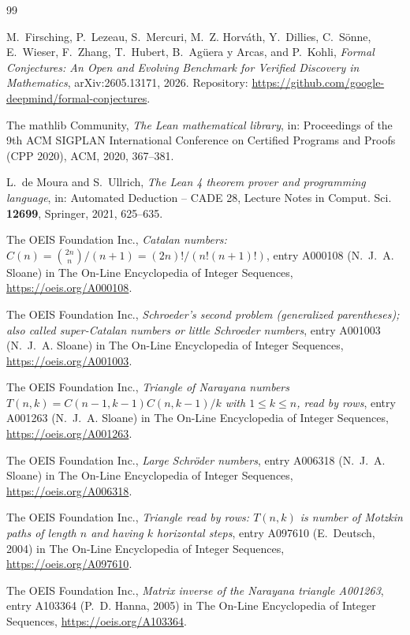 \documentclass[11pt]{amsart}
\theoremstyle{plain}
\theoremstyle{definition}
\begin{document}
{\footnotesize
\begin{thebibliography}{99}

M.~Firsching, P.~Lezeau, S.~Mercuri, M.~Z. Horv\'ath, Y.~Dillies, C.~S\"onne, E.~Wieser, F.~Zhang, T.~Hubert, B.~Ag\"uera y Arcas, and P.~Kohli, \emph{Formal Conjectures: An Open and Evolving Benchmark for Verified Discovery in Mathematics}, arXiv:2605.13171, 2026. Repository: \url{https://github.com/google-deepmind/formal-conjectures}.

The mathlib Community, \emph{The Lean mathematical library}, in: Proceedings of the 9th ACM SIGPLAN International Conference on Certified Programs and Proofs (CPP 2020), ACM, 2020, 367--381.

L.~de Moura and S.~Ullrich, \emph{The Lean 4 theorem prover and programming language}, in: Automated Deduction -- CADE 28, Lecture Notes in Comput. Sci. \textbf{12699}, Springer, 2021, 625--635.

The OEIS Foundation Inc., \emph{Catalan numbers: $C(n)=\binom{2n}{n}/(n+1)=(2n)!/(n!(n+1)!)$}, entry A000108 (N.~J.~A. Sloane) in The On-Line Encyclopedia of Integer Sequences, \url{https://oeis.org/A000108}.

The OEIS Foundation Inc., \emph{Schroeder's second problem (generalized parentheses); also called super-Catalan numbers or little Schroeder numbers}, entry A001003 (N.~J.~A. Sloane) in The On-Line Encyclopedia of Integer Sequences, \url{https://oeis.org/A001003}.

The OEIS Foundation Inc., \emph{Triangle of Narayana numbers $T(n,k)=C(n-1,k-1)C(n,k-1)/k$ with $1\le k\le n$, read by rows}, entry A001263 (N.~J.~A. Sloane) in The On-Line Encyclopedia of Integer Sequences, \url{https://oeis.org/A001263}.

The OEIS Foundation Inc., \emph{Large Schr\"oder numbers}, entry A006318 (N.~J.~A. Sloane) in The On-Line Encyclopedia of Integer Sequences, \url{https://oeis.org/A006318}.

The OEIS Foundation Inc., \emph{Triangle read by rows: $T(n,k)$ is number of Motzkin paths of length $n$ and having $k$ horizontal steps}, entry A097610 (E.~Deutsch, 2004) in The On-Line Encyclopedia of Integer Sequences, \url{https://oeis.org/A097610}.

The OEIS Foundation Inc., \emph{Matrix inverse of the Narayana triangle A001263}, entry A103364 (P.~D. Hanna, 2005) in The On-Line Encyclopedia of Integer Sequences, \url{https://oeis.org/A103364}.


\end{thebibliography}}
\end{document}
